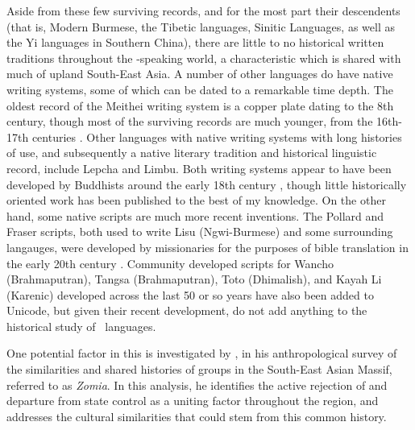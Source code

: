 Aside from these few surviving records, and for the most part their descendents (that is, Modern Burmese, the Tibetic languages, Sinitic Languages, as well as the Yi languages in Southern China), there are little to no historical written traditions throughout the \lfam-speaking world, a characteristic which is shared with much of upland South-East Asia. A number of other languages do have native writing systems, some of which can be dated to a remarkable time depth. The oldest record of the Meithei writing system is a copper plate dating to the 8th century, though most of the surviving records are much younger, from the 16th-17th centuries \cite{Chelliah2000}. Other languages with native writing systems with long histories of use, and subsequently a native literary tradition and historical linguistic record, include Lepcha and Limbu. Both writing systems appear to have been developed by Buddhists around the early 18th century \cite{Plaisier2007}, though little historically oriented work has been published to the best of my knowledge. On the other hand, some native scripts are much more recent inventions. The Pollard and Fraser scripts, both used to write Lisu (Ngwi-Burmese) and some surrounding langauges, were developed by missionaries for the purposes of bible translation in the early 20th century \cite{Bradley2017}. Community developed scripts for Wancho (Brahmaputran), Tangsa (Brahmaputran), Toto (Dhimalish), and Kayah Li (Karenic) developed across the last 50 or so years have also been added to Unicode, but given their recent development, do not add anything to the historical study of \lfam\ languages.

One potential factor in this is investigated by , in his anthropological survey of the similarities and shared histories of groups in the South-East Asian Massif, referred to as \textit{Zomia}. In this analysis, he identifies the active rejection of and departure from state control as a uniting factor throughout the region, and addresses the cultural similarities that could stem from this common history.

